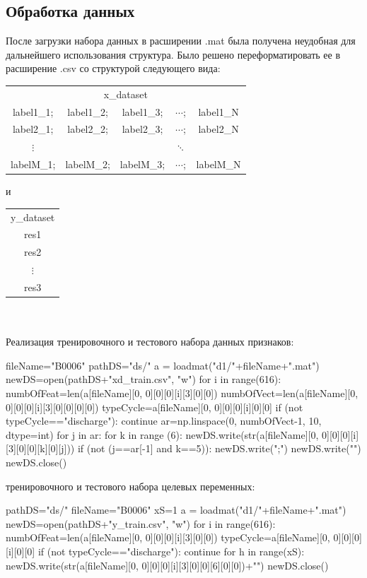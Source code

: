 \documentclass[russian,english,18pt,a4paper,reqno,dviphfm]{article}
\begin{document}
\subsection{Обработка данных}
После загрузки набора данных в расширении .mat была получена неудобная для дальнейшего использования структура. Было решено переформатировать ее в расширение .csv со структурой следующего вида:\\
\begin{tabular}{ccccc}
\multicolumn{5}{c}{x\_dataset}\\
label1\_1;&label1\_2;&label1\_3;&$\cdots$;&label1\_N\\
label2\_1;&label2\_2;&label2\_3;&$\cdots$;&label2\_N\\
$\vdots$&&&$\ddots$&\\
labelM\_1;&labelM\_2;&labelM\_3;&$\cdots$;&labelM\_N
\end{tabular} и 
\begin{tabular}{c}
y\_dataset\\
res1\\
res2\\
$\vdots$\\
res3\\
\end{tabular} \\\\
Реализация тренировочного и тестового набора данных признаков:
\begin{python}
fileName="B0006"
pathDS="ds/"
a = loadmat("d1/"+fileName+".mat")
newDS=open(pathDS+"xd_train.csv", "w")
for i in range(616):
    numbOfFeat=len(a[fileName][0, 0][0][0][i][3][0][0])
    numbOfVect=len(a[fileName][0, 0][0][0][i][3][0][0][0][0])    
    typeCycle=a[fileName][0, 0][0][0][i][0][0]
    if (not typeCycle=="discharge"):
        continue
    ar=np.linspace(0, numbOfVect-1, 10, dtype=int)
    for j in ar:
        for k in range (6): 
            newDS.write(str(a[fileName][0, 0][0][0][i][3][0][0][k][0][j]))
            if (not (j==ar[-1] and k==5)):
                newDS.write(";")
    newDS.write("\n")
newDS.close()
\end{python}

 тренировочного и тестового набора целевых переменных:
\begin{python}
pathDS="ds/"
fileName="B0006"
xS=1
a = loadmat("d1/"+fileName+".mat")
newDS=open(pathDS+"y_train.csv", "w")
for i in range(616):
    numbOfFeat=len(a[fileName][0, 0][0][0][i][3][0][0])
    typeCycle=a[fileName][0, 0][0][0][i][0][0]
    if (not typeCycle=="discharge"):
        continue
    for h in range(xS):
        newDS.write(str(a[fileName][0, 0][0][0][i][3][0][0][6][0][0])+"\n")
newDS.close()
\end{python} 
\end{document}
